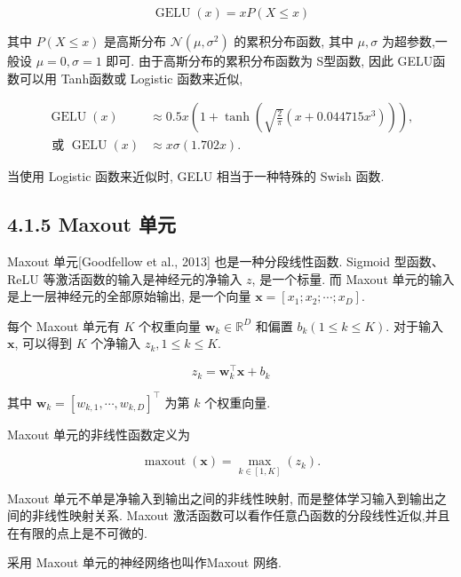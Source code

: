 \documentclass[10pt]{article}
\begin{document}
\begin{equation*}
\operatorname{GELU}(x)=x P(X \leq x) \tag{4.27}
\end{equation*}


其中 $P(X \leq x)$ 是高斯分布 $\mathcal{N}\left(\mu, \sigma^{2}\right)$ 的累积分布函数, 其中 $\mu, \sigma$ 为超参数,一般设 $\mu=0, \sigma=1$ 即可. 由于高斯分布的累积分布函数为 S型函数, 因此 GELU函数可以用 Tanh函数或 Logistic 函数来近似,


\begin{align*}
\operatorname{GELU}(x) & \approx 0.5 x\left(1+\tanh \left(\sqrt{\frac{2}{\pi}}\left(x+0.044715 x^{3}\right)\right)\right),  \tag{4.28}\\
\text { 或 } \operatorname{GELU}(x) & \approx x \sigma(1.702 x) . \tag{4.29}
\end{align*}


当使用 Logistic 函数来近似时, GELU 相当于一种特殊的 Swish 函数.

\subsection*{4.1.5 Maxout 单元}
Maxout 单元[Goodfellow et al., 2013] 也是一种分段线性函数. Sigmoid 型函数、 ReLU 等激活函数的输入是神经元的净输入 $z$, 是一个标量. 而 Maxout 单元的输入是上一层神经元的全部原始输出, 是一个向量 $\boldsymbol{x}=\left[x_{1} ; x_{2} ; \cdots ; x_{D}\right]$.

每个 Maxout 单元有 $K$ 个权重向量 $\boldsymbol{w}_{k} \in \mathbb{R}^{D}$ 和偏置 $b_{k}(1 \leq k \leq K)$. 对于输入 $\boldsymbol{x}$, 可以得到 $K$ 个净输入 $z_{k}, 1 \leq k \leq K$.


\begin{equation*}
z_{k}=\boldsymbol{w}_{k}^{\top} \boldsymbol{x}+b_{k} \tag{4.30}
\end{equation*}


其中 $\boldsymbol{w}_{k}=\left[w_{k, 1}, \cdots, w_{k, D}\right]^{\top}$ 为第 $k$ 个权重向量.

Maxout 单元的非线性函数定义为


\begin{equation*}
\operatorname{maxout}(\boldsymbol{x})=\max _{k \in[1, K]}\left(z_{k}\right) . \tag{4.31}
\end{equation*}


Maxout 单元不单是净输入到输出之间的非线性映射, 而是整体学习输入到输出之间的非线性映射关系. Maxout 激活函数可以看作任意凸函数的分段线性近似,并且在有限的点上是不可微的.

采用 Maxout 单元的神经网络也叫作Maxout 网络.
\end{document}
